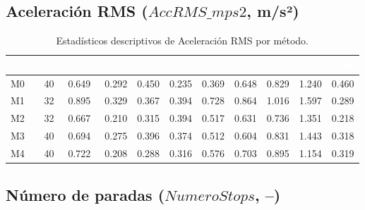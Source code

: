 \documentclass[12pt,a4paper,oneside]{book}
\begin{document}
\subsection{Aceleración RMS ($\textit{AccRMS\_mps2}$, m/s²)}

\begin{table}[H]
\centering
\caption{Estadísticos descriptivos de Aceleración RMS por método.}
\renewcommand{\arraystretch}{1.25}
\small
\begin{tabular}{lcccccccccc}
\toprule
\rowcolor{primary}
\textcolor{white}{\textbf{Mét.}} & \textcolor{white}{\textbf{n}} & \textcolor{white}{\textbf{Media}} & \textcolor{white}{\textbf{SD}} & \textcolor{white}{\textbf{CV}} & \textcolor{white}{\textbf{Mín}} & \textcolor{white}{\textbf{Q25}} & \textcolor{white}{\textbf{Med}} & \textcolor{white}{\textbf{Q75}} & \textcolor{white}{\textbf{Máx}} & \textcolor{white}{\textbf{IQR}} \\
\midrule
M0 & 40 & 0.649 & 0.292 & 0.450 & 0.235 & 0.369 & 0.648 & 0.829 & 1.240 & 0.460 \\
M1 & 32 & 0.895 & 0.329 & 0.367 & 0.394 & 0.728 & 0.864 & 1.016 & 1.597 & 0.289 \\
M2 & 32 & 0.667 & 0.210 & 0.315 & 0.394 & 0.517 & 0.631 & 0.736 & 1.351 & 0.218 \\
M3 & 40 & 0.694 & 0.275 & 0.396 & 0.374 & 0.512 & 0.604 & 0.831 & 1.443 & 0.318 \\
M4 & 40 & 0.722 & 0.208 & 0.288 & 0.316 & 0.576 & 0.703 & 0.895 & 1.154 & 0.319 \\
\bottomrule
\end{tabular}
\end{table}

\subsection{Número de paradas ($\textit{NumeroStops}$, --)}
\end{document}
